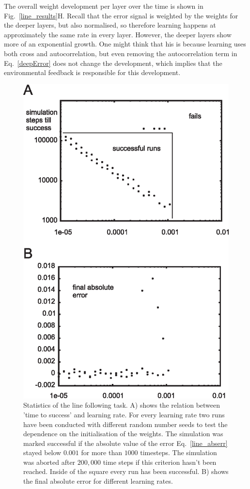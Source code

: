 \documentclass[Afour,sageh,times]{sagej}
\begin{document}
The overall weight development per layer over the time is shown in
Fig.~\ref{line_results}H. Recall that the error signal is weighted by
the weights for the deeper layers, but also normalised, so therefore
learning happens at approximately the same rate in every
layer. However, the deeper layers show more of an exponential
growth. One might think that his is because learning uses both
cross and autocorrelation, but even removing the autocorrelation
term in Eq.~\ref{deepError} does not change the development, which implies
that the environmental feedback is responsible for this development.

\begin{figure}[!ht]
  \centering
  \includegraphics[width=0.9\columnwidth]{line_stats}
  \caption{Statistics of the line following task. A) shows the relation between
    'time to success' and learning rate. For every learning rate two runs have
    been conducted with different random number seeds to test the dependence on the
    initialisation of the weights. The simulation was marked successful if the
    absolute value of the error Eq.~\ref{line_abserr} stayed below $0.001$ for more than $1000$
    timesteps. The simulation was aborted after $200,000$ time steps if this criterion
    hasn't been reached. Inside of the square every run has been successful.
    B) shows the final absolute error for different learning rates.
    \label{line_stats}}
\end{figure}
\end{document}
